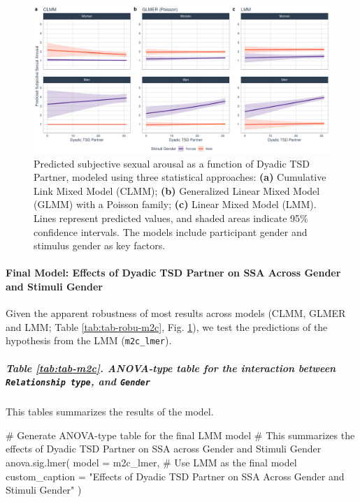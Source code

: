 \documentclass[
  bookmarksnumbered]{article}
\newenvironment{Shaded}{\begin{snugshade}}{\end{snugshade}}
\newcommand{\AttributeTok}[1]{\textcolor[rgb]{0.80,0.80,0.80}{#1}}
\newcommand{\CommentTok}[1]{\textcolor[rgb]{0.50,0.62,0.50}{#1}}
\newcommand{\FunctionTok}[1]{\textcolor[rgb]{0.94,0.94,0.56}{#1}}
\newcommand{\NormalTok}[1]{\textcolor[rgb]{0.80,0.80,0.80}{#1}}
\newcommand{\StringTok}[1]{\textcolor[rgb]{0.80,0.58,0.58}{#1}}
\begin{document}
\begin{figure}
\centering
\includegraphics{Sexual_Desire_Arousal_files/figure-latex/preds-m2c-1.pdf}
\caption{\label{fig:preds-m2c}Predicted subjective sexual arousal as a function of Dyadic TSD Partner, modeled using three statistical approaches: \textbf{(a)} Cumulative Link Mixed Model (CLMM); \textbf{(b)} Generalized Linear Mixed Model (GLMM) with a Poisson family; \textbf{(c)} Linear Mixed Model (LMM). Lines represent predicted values, and shaded areas indicate 95\% confidence intervals. The models include participant gender and stimulus gender as key factors.}
\end{figure}

\paragraph{Final Model: Effects of Dyadic TSD Partner on SSA Across Gender and Stimuli Gender}\label{final-model-effects-of-dyadic-tsd-partner-on-ssa-across-gender-and-stimuli-gender}

Given the apparent robustness of most results across models (CLMM, GLMER and LMM; Table \ref{tab:tab-robu-m2c}, Fig. \ref{fig:preds-m2c}), we test the predictions of the hypothesis from the LMM (\texttt{m2c\_lmer}).

\subparagraph{\texorpdfstring{Table \ref{tab:tab-m2c}. ANOVA-type table for the interaction between \texttt{Relationship\ type}, and \texttt{Gender}}{Table \ref{tab:tab-m2c}. ANOVA-type table for the interaction between Relationship type, and Gender}}\label{table-reftabtab-m2c.-anova-type-table-for-the-interaction-between-relationship-type-and-gender}

This tables summarizes the results of the model.

\begin{Shaded}
\begin{Highlighting}[]
\CommentTok{\# Generate ANOVA{-}type table for the final LMM model}
\CommentTok{\# This summarizes the effects of Dyadic TSD Partner on SSA across Gender and Stimuli Gender}
\FunctionTok{anova.sig.lmer}\NormalTok{(}
  \AttributeTok{model =}\NormalTok{ m2c\_lmer, }\CommentTok{\# Use LMM as the final model}
  \AttributeTok{custom\_caption =} \StringTok{"Effects of Dyadic TSD Partner on SSA Across Gender and Stimuli Gender"}
\NormalTok{)}
\end{Highlighting}
\end{Shaded}
\end{document}
